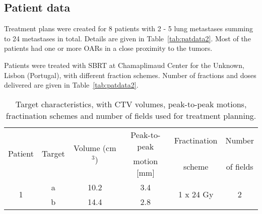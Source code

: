 \documentclass[type=dr, dr=rernat, accentcolor=tud7b,colorbacktitle, bigchapter, openright, twoside, 12pt ]{tudthesis}
\begin{document}
\subsection{Patient data}

Treatment plans were created for 8 patients with 2 - 5 lung metastases summing to 24 metastases in total. Details are given in Table~\ref{tab:patdata2}.
Most of the patients had one or more OARs in a close proximity to the tumors. 

Patients were treated with SBRT at Chamaplimaud Center for the Unknown, Lisbon (Portugal), with different fraction schemes. Number of fractions and doses delivered are given in Table~\ref{tab:patdata2}. 

\begin{table}[H]
	\centering
	\caption{Target characteristics, with CTV volumes, peak-to-peak motions, fractination schemes and number of fields used for treatment planning.}
	\begin{tabular}{c|c|c|c|c|c}
		\hline\hline
		\multirow{2}{*}{Patient} & \multirow{2}{*}{Target} & \multirow{2}{*}{Volume (cm$^3$)} & Peak-to-peak & Fractination & Number \\
		 & & & motion [mm] & scheme & of fields \\
		\hline
		\multirow{2}{*}{1} & a & 10.2 & 3.4  & \multirow{2}{*}{1 x 24 Gy} & \multirow{2}{*}{2} \\
		 & b & 14.4 & 2.8 &  &  \\
		 

\end{tabular}
\end{table}
\end{document}
